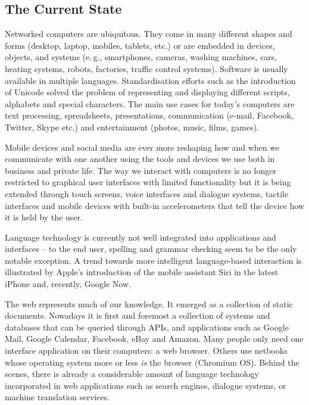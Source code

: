 \documentclass[10pt, plain]{../../metanetpaper}
\begin{document}

\begin{multicols}{2}

\subsection{The Current State}
\label{sec:ict-trends}

Networked computers are ubiquitous. They come in many different shapes and forms (desktop, laptop, mobiles, tablets, etc.) or are embedded in devices, objects, and systems (e.\,g., smartphones, cameras, washing machines, cars, heating systems, robots, factories, traffic control systems). Software is usually available in multiple languages. Standardisation efforts such as the introduction of Unicode solved the problem of representing and displaying different scripts, alphabets and special characters. The main use cases for today's computers are text processing, spreadsheets, presentations, communication (e-mail, Facebook, Twitter, Skype etc.) and entertainment (photos, music, films, games).

Mobile devices and social media are ever more reshaping how and when we communicate with one another using the tools and devices we use both in business and private life. The way we interact with computers is no longer restricted to graphical user interfaces with limited functionality but it is being extended through touch screens, voice interfaces and dialogue systems, tactile interfaces and mobile devices with built-in accelerometers that tell the device how it is held by the user.

Language technology is currently not well integrated into applications and interfaces -- to the end user, spelling and grammar checking seem to be the only notable exception. A trend towards more intelligent language-based interaction is illustrated by Apple’s introduction of the mobile assistant Siri in the latest iPhone and, recently, Google Now.

The web represents much of our knowledge. It emerged as a collection of static documents. Nowadays it is first and foremost a collection of systems and databases that can be queried through APIs, and applications such as Google Mail, Google Calendar, Facebook, eBay and Amazon. Many people only need one interface application on their computers: a web browser. Others use netbooks whose operating system more or less \emph{is} the browser (Chromium OS). Behind the scenes, there is already a considerable amount of language technology incorporated in web applications such as search engines, dialogue systems, or machine translation services.


\end{multicols}
\end{document}

